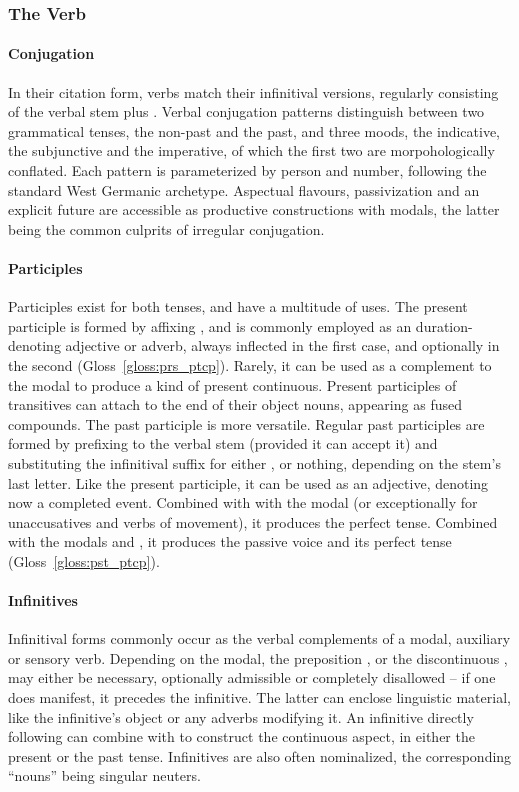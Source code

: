\subsubsection{The Verb}
\paragraph{Conjugation}
In their citation form, verbs match their infinitival versions, regularly consisting of the verbal stem plus .
Verbal conjugation patterns distinguish between two grammatical tenses, the non-past and the past, and three moods, the indicative, the subjunctive and the imperative, of which the first two are morpohologically conflated.
Each pattern is parameterized by person and number, following the standard West Germanic archetype.
Aspectual flavours, passivization and an explicit future are accessible as productive constructions with modals, the latter being the common culprits of irregular conjugation.

\paragraph{Participles}
Participles exist for both tenses, and have a multitude of uses.
The present participle is formed by affixing , and is commonly employed as an duration-denoting adjective or adverb, always inflected in the first case, and optionally in the second (Gloss~\ref{gloss:prs_ptcp}).
Rarely, it can be used as a complement to the modal  to produce a kind of present continuous.
Present participles of transitives can attach to the end of their object nouns, appearing as fused compounds.
The past participle is more versatile.
Regular past participles are formed by prefixing  to the verbal stem (provided it can accept it) and substituting the infinitival suffix for either ,  or nothing, depending on the stem's last letter.
Like the present participle, it can be used as an adjective, denoting now a completed event.
Combined with with the modal  (or exceptionally  for unaccusatives and verbs of movement), it produces the perfect tense.
Combined with the modals  and , it produces the passive voice and its perfect tense (Gloss~\ref{gloss:pst_ptcp}).

\paragraph{Infinitives}
Infinitival forms commonly occur as the verbal complements of a modal, auxiliary or sensory verb.
Depending on the modal, the preposition , or the discontinuous , may either be necessary, optionally admissible or completely disallowed -- if one does manifest, it precedes the infinitive.
The latter can enclose linguistic material, like the infinitive's object or any adverbs modifying it.
An infinitive directly following  can combine with  to construct the continuous aspect, in either the present or the past tense.
Infinitives are also often nominalized, the corresponding ``nouns'' being singular neuters.

